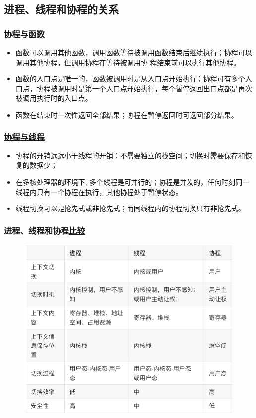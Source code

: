\subsection{进程、线程和协程的关系}
% 
\begin{frame}[fragile]
    \frametitle{\href{https://zh.wikipedia.org/wiki/\%E5\%8D\%8F\%E7\%A8\%8B}{协程与函数}}

    \begin{itemize}
        \item 函数可以调用其他函数，调用函数等待被调用函数结束后继续执行；协程可以调用其他协程，但调用协程在等待被调用协 程结束前可以执行其他协程。
        \item 函数的入口点是唯一的，函数被调用时是从入口点开始执行；协程可有多个入口点，协程被调用时是第一个入口点开始执行，每个暂停返回出口点都是再次被调用执行时的入口点。
        \item 函数在结束时一次性返回全部结果；协程在暂停返回时可返回部分结果。
    \end{itemize}

% 

\end{frame}
\begin{frame}[fragile]
    \frametitle{\href{https://www.cnblogs.com/theRhyme/p/14061698.html}{协程与线程}}

    \begin{itemize}
        \item 协程的开销远远小于线程的开销：不需要独立的栈空间；切换时需要保存和恢复的数据少；
        \item 在多核处理器的环境下, 多个线程是可并行的；协程是并发的，任何时刻同一线程内只有一个协程在执行，其他协程处于暂停状态。
        \item 线程切换可以是抢先式或非抢先式；而同线程内的协程切换只有非抢先式。
    \end{itemize}

% 

\end{frame}
\begin{frame}[fragile]
    \frametitle{进程、线程和协程\href{https://www.cnblogs.com/theRhyme/p/14061698.html}{比较}}
% 
	\begin{figure}
		\centering
		\includegraphics[width=0.55\linewidth]{figs/proc-thread-coroutine.png}
	\end{figure}
\end{frame}

